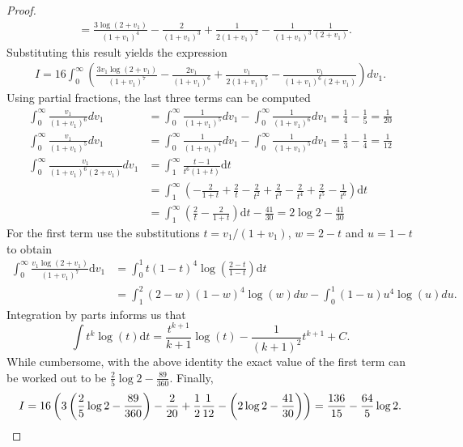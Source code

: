 \documentclass[11pt]{article}
\newcommand{\dd}{\mathrm{d}}
\begin{document}
\begin{proof}
\begin{align*}
        &=\frac{3\log\left(2+v_{1}\right)}{\left(1+v_{1}\right)^{4}}-\frac{2}{\left(1+v_{1}\right)^{3}}+\frac{1}{2\left(1+v_{1}\right)^{2}}-\frac{1}{\left(1+v_{1}\right)^{3}}\frac{1}{\left(2+v_{1}\right)}.
    \end{align*}
    Substituting this result yields the expression
    \begin{align*}
        I=16\int_{0}^{\infty}\left(\frac{3v_{1}\log\left(2+v_{1}\right)}{\left(1+v_{1}\right)^{7}}-\frac{2v_{1}}{\left(1+v_{1}\right)^{6}}+\frac{v_{1}}{2\left(1+v_{1}\right)^{5}}-\frac{v_{1}}{\left(1+v_{1}\right)^{6}\left(2+v_{1}\right)}\right)dv_{1}.
    \end{align*}
    Using partial fractions, the last three terms can be computed
    \begin{align*}
        \int_{0}^{\infty}\frac{v_{1}}{\left(1+v_{1}\right)^{6}}dv_{1}&=\int_{0}^{\infty}\frac{1}{\left(1+v_{1}\right)^{5}}dv_{1}-\int_{0}^{\infty}\frac{1}{\left(1+v_{1}\right)^{6}}dv_{1}=\frac{1}{4}-\frac{1}{5}=\frac{1}{20}\\
        \int_{0}^{\infty}\frac{v_{1}}{\left(1+v_{1}\right)^{5}}dv_{1}&=\int_{0}^{\infty}\frac{1}{\left(1+v_{1}\right)^{4}}dv_{1}-\int_{0}^{\infty}\frac{1}{\left(1+v_{1}\right)^{5}}dv_{1}=\frac{1}{3}-\frac{1}{4}=\frac{1}{12}\\
        \int_{0}^{\infty}\frac{v_{1}}{\left(1+v_{1}\right)^{6}\left(2+v_{1}\right)}dv_{1}&=\int_1^\infty\frac{t-1}{t^6(1+t)}\dd t\\
        &=\int_1^\infty\left(-\frac{2}{1+t}+\frac{2}{t}-\frac{2}{t^{2}}+\frac{2}{t^{3}}-\frac{2}{t^{4}}+\frac{2}{t^{5}}-\frac{1}{t^{6}}\right)\dd t\\&=\int_1^\infty\left(\frac{2}{t}-\frac{2}{1+t}\right)\dd t-\frac{41}{30}=2\log 2-\frac{41}{30}
    \end{align*}
    For the first term use the substitutions $t=v_1/(1+v_1)$, $w=2-t$ and $u=1-t$ to obtain
    \begin{align*}
        \int_{0}^{\infty}\frac{v_1\log\left(2+v_1\right)}{\left(1+v_1\right)^{7}}\dd v_1&=\int_{0}^{1}t\left(1-t\right)^{4}\log\left(\frac{2-t}{1-t}\right)\dd t\\
        &=\int_{1}^{2}\left(2-w\right)\left(1-w\right)^{4}\log\left(w\right)dw-\int_{0}^{1}\left(1-u\right)u^{4}\log\left(u\right)du.
    \end{align*}
    Integration by parts informs us that
    $$
    \int t^k\log (t)\dd t=\frac{t^{k+1}}{k+1}\log(t)-\frac{1}{(k+1)^2} t^{k+1}+C.
    $$
    While cumbersome, with the above identity the exact value of the first term can be worked out to be $\frac{2}{5}\log2-\frac{89}{360}$. Finally,
    \begin{equation*}
        I=16\left(3\left(\frac{2}{5}\log2-\frac{89}{360}\right)-\frac{2}{20}+\frac{1}{2}\frac{1}{12}-\left(2\log 2-\frac{41}{30}\right)\right)=\frac{136}{15}-\frac{64}{5}\log2. \qedhere
    \end{equation*}
\end{proof}
\end{document}
